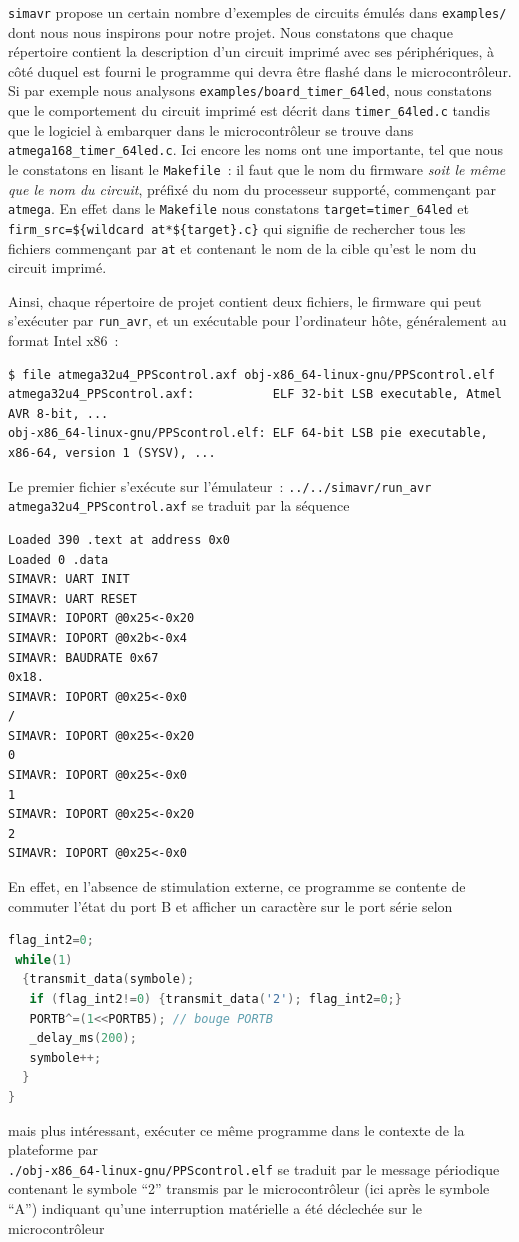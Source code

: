 \documentclass[a4paper]{article}
\begin{document}
{\tt simavr} propose un certain nombre d'exemples de circuits \'emul\'es dans
{\tt examples/} dont nous nous inspirons pour notre projet. Nous constatons que
chaque r\'epertoire contient la description d'un circuit imprim\'e avec ses 
p\'eriph\'eriques, \`a c\^ot\'e duquel est fourni le programme qui devra \^etre
flash\'e dans le microcontr\^oleur. Si par exemple nous analysons
{\tt examples/board\_timer\_64led}, nous constatons que le comportement du 
circuit imprim\'e est d\'ecrit dans {\tt timer\_64led.c} tandis que le logiciel 
\`a embarquer dans le microcontr\^oleur se trouve dans 
{\tt atmega168\_timer\_64led.c}. Ici encore les noms ont une importante, tel 
que nous le constatons en lisant le {\tt Makefile}~: il faut que le nom du 
firmware {\em soit le m\^eme que le nom du circuit}, pr\'efix\'e du nom du 
processeur support\'e, commen\c cant par {\tt atmega}. En effet dans le 
{\tt Makefile} nous constatons {\tt target=timer\_64led} et 
{\tt firm\_src=\$\{wildcard at*\$\{target\}.c\}} qui signifie de rechercher 
tous les fichiers commen\c cant par {\tt at} et contenant le nom de la cible 
qu'est le nom du circuit imprim\'e.

Ainsi, chaque r\'epertoire de projet contient deux fichiers, le firmware qui 
peut s'ex\'ecuter par {\tt run\_avr}, et un ex\'ecutable pour l'ordinateur 
h\^ote, g\'en\'eralement au format Intel x86~:
\begin{verbatim}
$ file atmega32u4_PPScontrol.axf obj-x86_64-linux-gnu/PPScontrol.elf 
atmega32u4_PPScontrol.axf:           ELF 32-bit LSB executable, Atmel AVR 8-bit, ...
obj-x86_64-linux-gnu/PPScontrol.elf: ELF 64-bit LSB pie executable, x86-64, version 1 (SYSV), ...
\end{verbatim}
Le premier fichier s'ex\'ecute sur l'\'emulateur~: 
\verb~../../simavr/run_avr atmega32u4_PPScontrol.axf~ se traduit
par la s\'equence
{\footnotesize
\begin{verbatim}
Loaded 390 .text at address 0x0
Loaded 0 .data
SIMAVR: UART INIT
SIMAVR: UART RESET
SIMAVR: IOPORT @0x25<-0x20
SIMAVR: IOPORT @0x2b<-0x4
SIMAVR: BAUDRATE 0x67
0x18.
SIMAVR: IOPORT @0x25<-0x0
/
SIMAVR: IOPORT @0x25<-0x20
0
SIMAVR: IOPORT @0x25<-0x0
1
SIMAVR: IOPORT @0x25<-0x20
2
SIMAVR: IOPORT @0x25<-0x0
\end{verbatim}
}

En effet, en l'absence de stimulation externe, ce programme se contente de 
commuter l'\'etat du port B et afficher un caract\`ere sur le port s\'erie selon
\begin{lstlisting}[language=C]
 flag_int2=0;   
 while(1)
  {transmit_data(symbole);
   if (flag_int2!=0) {transmit_data('2'); flag_int2=0;}
   PORTB^=(1<<PORTB5); // bouge PORTB 
   _delay_ms(200);
   symbole++;
  }
}
\end{lstlisting}
mais plus int\'eressant, ex\'ecuter ce m\^eme programme dans le contexte de la 
plateforme par\\
\verb~./obj-x86_64-linux-gnu/PPScontrol.elf~ se traduit par le message 
p\'eriodique contenant le symbole ``2'' transmis par le microcontr\^oleur (ici 
apr\`es le symbole ``A'') indiquant qu'une interruption mat\'erielle a \'et\'e 
d\'eclech\'ee sur le microcontr\^oleur
\end{document}
